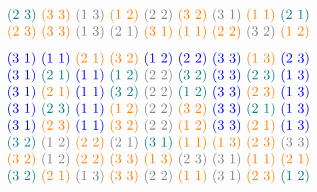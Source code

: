 \begin{xmpl}
$$\begin{tabular}{c}
		\textcolor{teal}{(2 3)} \textcolor{orange}{(3 3)} \textcolor{gray}{(1 3)} \textcolor{orange}{(1 2)} \textcolor{gray}{(2 2)} \textcolor{orange}{(3 2)} \textcolor{gray}{(3 1)} \textcolor{orange}{(1 1)} \textcolor{teal}{(2 1)}\\
		\textcolor{orange}{(2 3)} \textcolor{orange}{(3 3)} \textcolor{gray}{(1 3)} \textcolor{gray}{(2 1)} \textcolor{orange}{(3 1)} \textcolor{orange}{(1 1)} \textcolor{orange}{(2 2)} \textcolor{gray}{(3 2)} \textcolor{orange}{(1 2)}
      \end{tabular}
$$
$$
    \begin{tabular}{c}
		\textcolor{blue}{(3 1)} \textcolor{blue}{(1 1)} \textcolor{orange}{(2 1)} \textcolor{orange}{(3 2)} \textcolor{blue}{(1 2)} \textcolor{blue}{(2 2)} \textcolor{blue}{(3 3)} \textcolor{orange}{(1 3)} \textcolor{blue}{(2 3)}\\
		\textcolor{blue}{(3 1)} \textcolor{teal}{(2 1)} \textcolor{blue}{(1 1)} \textcolor{teal}{(1 2)} \textcolor{gray}{(2 2)} \textcolor{teal}{(3 2)} \textcolor{blue}{(3 3)} \textcolor{teal}{(2 3)} \textcolor{blue}{(1 3)}\\
		\textcolor{blue}{(3 1)} \textcolor{orange}{(2 1)} \textcolor{blue}{(1 1)} \textcolor{teal}{(3 2)} \textcolor{gray}{(2 2)} \textcolor{teal}{(1 2)} \textcolor{blue}{(3 3)} \textcolor{orange}{(2 3)} \textcolor{blue}{(1 3)}\\
		\textcolor{blue}{(3 1)} \textcolor{teal}{(2 3)} \textcolor{blue}{(1 1)} \textcolor{orange}{(1 2)} \textcolor{gray}{(2 2)} \textcolor{orange}{(3 2)} \textcolor{blue}{(3 3)} \textcolor{teal}{(2 1)} \textcolor{blue}{(1 3)}\\
		\textcolor{blue}{(3 1)} \textcolor{orange}{(2 3)} \textcolor{blue}{(1 1)} \textcolor{orange}{(3 2)} \textcolor{gray}{(2 2)} \textcolor{orange}{(1 2)} \textcolor{blue}{(3 3)} \textcolor{orange}{(2 1)} \textcolor{blue}{(1 3)}\\
		\textcolor{teal}{(3 2)} \textcolor{gray}{(1 2)} \textcolor{orange}{(2 2)} \textcolor{gray}{(2 1)} \textcolor{teal}{(3 1)} \textcolor{orange}{(1 1)} \textcolor{orange}{(1 3)} \textcolor{orange}{(2 3)} \textcolor{gray}{(3 3)}\\
		\textcolor{orange}{(3 2)} \textcolor{gray}{(1 2)} \textcolor{orange}{(2 2)} \textcolor{orange}{(3 3)} \textcolor{orange}{(1 3)} \textcolor{gray}{(2 3)} \textcolor{gray}{(3 1)} \textcolor{orange}{(1 1)} \textcolor{orange}{(2 1)}\\
		\textcolor{teal}{(3 2)} \textcolor{orange}{(2 1)} \textcolor{gray}{(1 3)} \textcolor{orange}{(3 3)} \textcolor{gray}{(2 2)} \textcolor{orange}{(1 1)} \textcolor{gray}{(3 1)} \textcolor{orange}{(2 3)} \textcolor{teal}{(1 2)}\\

\end{tabular}$$
\end{xmpl}
